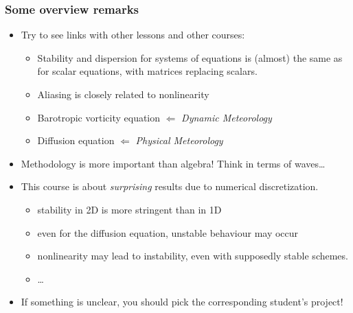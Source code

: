 \documentclass[aspectratio=43,9pt]{beamer}
\begin{document}
%
%
\begin{frame}
	\frametitle{Some overview remarks}
	\begin{itemize}
		\item Try to see links with other lessons and other courses:\vspace*{1ex}
			\begin{itemize}
				\item Stability and dispersion for systems of equations is (almost) the same as for scalar equations, with matrices replacing scalars.\vspace*{1ex}
				\item Aliasing is closely related to nonlinearity\vspace*{1ex}
				\item Barotropic vorticity equation $\Leftarrow$ \emph{Dynamic Meteorology}\vspace*{1ex}
				\item Diffusion equation $\Leftarrow$ \emph{Physical Meteorology}
			\end{itemize}\vspace*{2ex}
		\item Methodology is more important than algebra! Think in terms of waves\ldots\vspace*{2ex}
		\item This course is about \emph{surprising} results due to numerical discretization.\vspace*{1ex}
			\begin{itemize}
				\item stability in 2D is more stringent than in 1D\vspace*{1ex}
				\item even for the diffusion equation, unstable behaviour may occur\vspace*{1ex}
				\item nonlinearity may lead to instability, even with supposedly stable schemes.\vspace*{1ex}
				\item \ldots\vspace*{2ex}
			\end{itemize}
		\item If something is unclear, you should pick the corresponding student's project!
	\end{itemize}
\end{frame}
%
%
\end{document}
